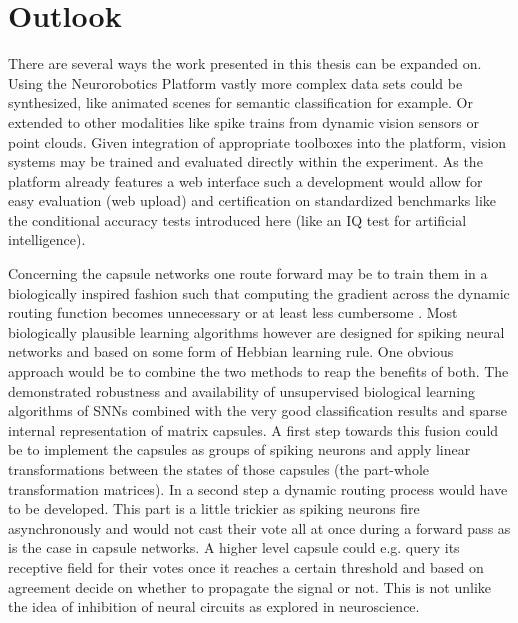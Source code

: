 \section{Outlook}
There are several ways the work presented in this thesis can be expanded on. Using the Neurorobotics Platform vastly more complex data sets could be synthesized, like animated scenes for semantic classification for example. Or extended to other modalities like spike trains from dynamic vision sensors or point clouds. Given integration of appropriate toolboxes into the platform, vision systems may be trained and evaluated directly within the experiment. As the platform already features a web interface such a development would allow for easy evaluation (web upload) and certification on standardized benchmarks like the conditional accuracy tests introduced here (like an IQ test for artificial intelligence).

Concerning the capsule networks one route forward may be to train them in a biologically inspired fashion such that computing the gradient across the dynamic routing function becomes unnecessary or at least less cumbersome \cite{ bartunov2018assessing}. Most biologically plausible learning algorithms however are designed for spiking neural networks and based on some form of Hebbian learning rule. One obvious approach would be to combine the two methods to reap the benefits of both. The demonstrated robustness and availability of unsupervised biological learning algorithms of SNNs combined with the very good classification results and sparse internal representation of matrix capsules. A first step towards this fusion could be to implement the capsules as groups of spiking neurons and apply linear transformations between the states of those capsules (the part-whole transformation matrices). In a second step a dynamic routing process would have to be developed. This part is a little trickier as spiking neurons fire asynchronously and would not cast their vote all at once during a forward pass as is the case in capsule networks. A higher level capsule could e.g. query its receptive field for their votes once it reaches a certain threshold and based on agreement decide on whether to propagate the signal or not. This is not unlike the idea of inhibition of neural circuits as explored in neuroscience.